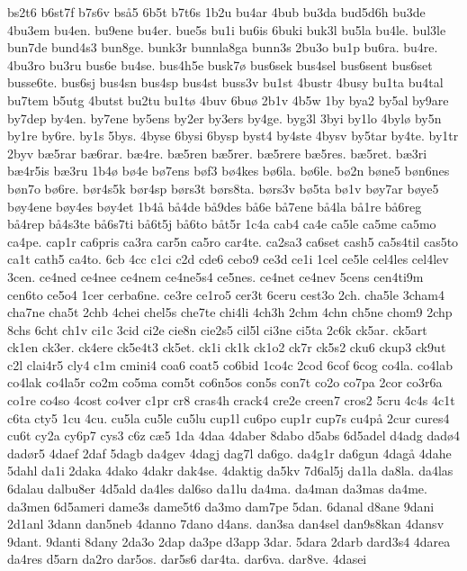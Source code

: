 {bs2t6
b6st7f
b7s6v
bs^^e55
6b5t
b7t6s
1b2u
bu4ar
4bub
bu3da
bud5d6h
bu3de
4bu3em
bu4en.
bu9ene
bu4er.
bue5s
bu1i
bu6is
6buki
buk3l
bu5la
bu4le.
bul3le
bun7de
bund4s3
bun8ge.
bunk3r
bunnla8ga
bunn3s
2bu3o
bu1p
bu6ra.
bu4re.
4bu3ro
bu3ru
bus6e
bu4se.
bus4h5e
busk7^^f8
bus6sek
bus4sel
bus6sent
bus6set
busse6te.
bus6sj
bus4sn
bus4sp
bus4st
buss3v
bu1st
4bustr
4busy
bu1ta
bu4tal
bu7tem
b5utg
4butst
bu2tu
bu1t^^f8
4buv
6bu^^f8
2b1v
4b5w
1by
bya2
by5al
by9are
by7dep
by4en.
by7ene
by5ens
by2er
by3ers
by4ge.
byg3l
3byi
by1lo
4byl^^f8
by5n
by1re
by6re.
by1s
5bys.
4byse
6bysi
6bysp
byst4
by4ste
4bysv
by5tar
by4te.
by1tr
2byv
b^^e65rar
b^^e66rar.
b^^e64re.
b^^e65ren
b^^e65rer.
b^^e65rere
b^^e65res.
b^^e65ret.
b^^e63ri
b^^e64r5is
b^^e63ru
1b4^^f8
b^^f84e
b^^f87ens
b^^f8f3
b^^f84kes
b^^f86la.
b^^f86le.
b^^f82n
b^^f8ne5
b^^f8n6nes
b^^f8n7o
b^^f86re.
b^^f8r4s5k
b^^f8r4sp
b^^f8rs3t
b^^f8rs8ta.
b^^f8rs3v
b^^f85ta
b^^f81v
b^^f8y7ar
b^^f8ye5
b^^f8y4ene
b^^f8y4es
b^^f8y4et
1b4^^e5
b^^e54de
b^^e59des
b^^e56e
b^^e57ene
b^^e54la
b^^e51re
b^^e56reg
b^^e54rep
b^^e54s3te
b^^e56s7ti
b^^e56t5j
b^^e56to
b^^e5t5r
1c4a
cab4
ca4e
ca5le
ca5me
ca5mo
ca4pe.
cap1r
ca6pris
ca3ra
car5n
ca5ro
car4te.
ca2sa3
ca6set
cash5
ca5s4til
cas5to
ca1t
cath5
ca4to.
6cb
4cc
c1ci
c2d
cde6
cebo9
ce3d
ce1i
1cel
ce5le
cel4les
cel4lev
3cen.
ce4ned
ce4nee
ce4nem
ce4ne5s4
ce5nes.
ce4net
ce4nev
5cens
cen4ti9m
cen6to
ce5o4
1cer
cerba6ne.
ce3re
ce1ro5
cer3t
6ceru
cest3o
2ch.
cha5le
3cham4
cha7ne
cha5t
2chb
4chei
chel5s
che7te
chi4li
4ch3h
2chm
4chn
ch5ne
chom9
2chp
8chs
6cht
ch1v
ci1c
3cid
ci2e
cie8n
cie2s5
cil5l
ci3ne
ci5ta
2c6k
ck5ar.
ck5art
ck1en
ck3er.
ck4ere
ck5e4t3
ck5et.
ck1i
ck1k
ck1o2
ck7r
ck5s2
cku6
ckup3
ck9ut
c2l
clai4r5
cly4
c1m
cmini4
coa6
coat5
co6bid
1co4c
2cod
6cof
6cog
co4la.
co4lab
co4lak
co4la5r
co2m
co5ma
com5t
co6n5os
con5s
con7t
co2o
co7pa
2cor
co3r6a
co1re
co4so
4cost
co4ver
c1pr
cr8
cras4h
crack4
cre2e
creen7
cros2
5cru
4c4s
4c1t
c6ta
cty5
1cu
4cu.
cu5la
cu5le
cu5lu
cup1l
cu6po
cup1r
cup7s
cu4p^^e5
2cur
cures4
cu6t
cy2a
cy6p7
cys3
c6z
c^^e65
1da
4daa
4daber
8dabo
d5abs
6d5adel
d4adg
dad^^f84
dad^^f8r5
4daef
2daf
5dagb
da4gev
4dagj
dag7l
da6go.
da4g1r
da6gun
4dag^^e5
4dahe
5dahl
da1i
2daka
4dako
4dakr
dak4se.
4daktig
da5kv
7d6al5j
da1la
da8la.
da4las
6dalau
dalbu8er
4d5ald
da4les
dal6so
da1lu
da4ma.
da4man
da3mas
da4me.
da3men
6d5ameri
dame3s
dame5t6
da3mo
dam7pe
5dan.
6danal
d8ane
9dani
2d1anl
3dann
dan5neb
4danno
7dano
d4ans.
dan3sa
dan4sel
dan9s8kan
4dansv
9dant.
9danti
8dany
2da3o
2dap
da3pe
d3app
3dar.
5dara
2darb
dard3s4
4darea
da4res
d5arn
da2ro
dar5os.
dar5s6
dar4ta.
dar6va.
dar8ve.
4dasei
}
